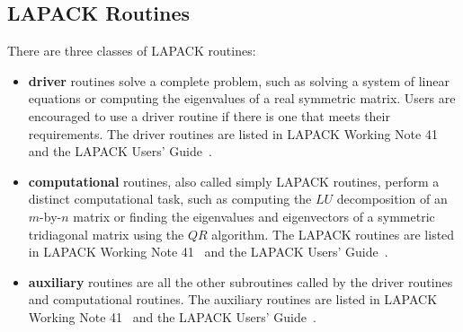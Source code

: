 \documentclass[11pt]{report}
\begin{document}
\subsection{LAPACK Routines}

There are three classes of LAPACK routines:
\begin{itemize}

\item \textbf{driver} routines solve a complete problem, such as solving
a system of linear equations or computing the eigenvalues of a real
symmetric matrix.  Users are encouraged to use a driver routine if there
is one that meets their requirements.  The driver routines are listed
in LAPACK Working Note 41~\cite{WN41} and the LAPACK Users' Guide~\cite{LUG}.

\item \textbf{computational} routines, also called simply LAPACK routines,
perform a distinct computational task, such as computing
the $LU$ decomposition of an $m$-by-$n$ matrix or finding the
eigenvalues and eigenvectors of a symmetric tridiagonal matrix using
the $QR$ algorithm. 
The LAPACK routines are listed in LAPACK Working Note 41~\cite{WN41}
and the LAPACK Users' Guide~\cite{LUG}.

\item \textbf{auxiliary} routines are all the other subroutines called
by the driver routines and computational routines.  
The auxiliary routines are listed in LAPACK Working Note 41~\cite{WN41}
and the LAPACK Users' Guide~\cite{LUG}.
\end{itemize}
\end{document}
